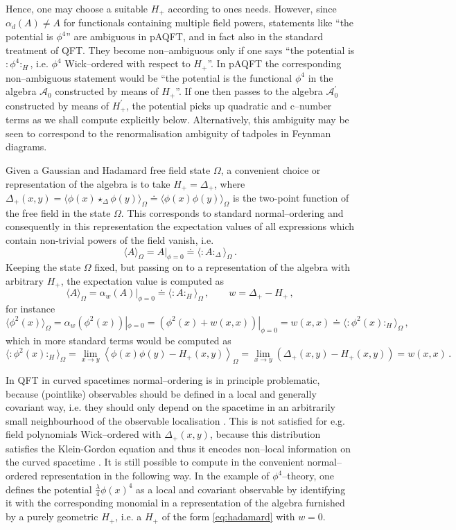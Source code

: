 \documentclass[a4paper,10pt,twoside]{article}
\numberwithin{equation}{section}
\newcounter{and}
\def\A{\mathcal{A}}
\newcommand{\wick}[1]{:\!{#1}\!:}
\theoremstyle{plain}
\theoremstyle{definition}
\begin{document}
Hence, one may choose a suitable $H_+$ according to ones needs. However, since $\alpha_{d}(A)\neq A$ for functionals containing multiple field powers, statements like ``the potential is $\phi^4$'' are ambiguous in pAQFT, and in fact also in the standard treatment of QFT. They become non--ambiguous only if one says ``the potential is $\wick{\phi^4}_H$, i.e.  $\phi^4$ Wick--ordered with respect to $H_+$''. In pAQFT the corresponding non--ambiguous statement would be ``the potential is the functional $\phi^4$ in the algebra $\A_0$ constructed by means of $H_+$''. If one then passes to the algebra $\A^\prime_0$ constructed by means of $H^\prime_+$, the potential picks up quadratic and c--number terms as we shall compute explicitly below. Alternatively, this ambiguity may be seen to correspond to the renormalisation ambiguity of tadpoles in Feynman diagrams.


Given a Gaussian and Hadamard free field state $\Omega$, a convenient choice or representation of the algebra is to take $H_+=\Delta_+$, where $\Delta_+(x,y)=\langle \phi(x)\star_\Delta\phi(y)\rangle_\Omega\doteq\langle \phi(x)\phi(y)\rangle_\Omega$ is the two-point function of the free field in the state $\Omega$. This corresponds to standard normal--ordering and consequently in this  representation the expectation values of all expressions which contain non-trivial powers of the field vanish, i.e.
\begin{equation}\label{eq_expval} \langle A\rangle_\Omega = A|_{\phi=0}\doteq \langle \wick{A}_\Delta\rangle_\Omega\,.\end{equation}
Keeping the state $\Omega$ fixed, but passing on to a representation of the algebra with arbitrary $H_+$, the expectation value is computed as
$$ \langle A\rangle_\Omega = \alpha_w(A)|_{\phi=0}\doteq \langle \wick{A}_H\rangle_\Omega\,, \qquad w=\Delta_+-H_+\,,$$
for instance
$$\langle \phi^2(x)\rangle_\Omega = \alpha_w(\phi^2(x))|_{\phi=0}=\left(\phi^2(x)+w(x,x)\right)|_{\phi=0}=w(x,x)\doteq \langle \wick{\phi^2(x)}_H\rangle_\Omega \,,$$
which in more standard terms would be computed as
$$\label{eq_expval2}\langle \wick{\phi^2(x)}_H\rangle_\Omega =\lim_{x\to y}\left\langle \phi(x)\phi(y)-H_+(x,y)\right\rangle_\Omega=\lim_{x\to y}\left(\Delta_+(x,y)-H_+(x,y)\right)=w(x,x)\,.$$

In QFT in curved spacetimes normal--ordering is in principle problematic, because (pointlike) observables should be defined in a local and generally covariant way, i.e. they should only depend on the spacetime in an arbitrarily small neighbourhood of the observable localisation \cite{Brunetti:2001dx, Hollands:2001nf}. This is not satisfied for e.g. field polynomials Wick--ordered with $\Delta_+(x,y)$, because this distribution satisfies the Klein-Gordon equation and thus it encodes non--local information on the curved spacetime \cite{Hollands:2001nf}. It is still possible to compute in the convenient normal--ordered representation in the following way. In the example of $\phi^4$--theory, one defines the potential $\frac{\lambda}{4} \phi(x)^4$ as a local and covariant observable by identifying it with the corresponding monomial in a representation of the algebra furnished by a purely geometric $H_+$, i.e. a $H_+$ of the form \eqref{eq:hadamard} with $w=0$.
\end{document}
